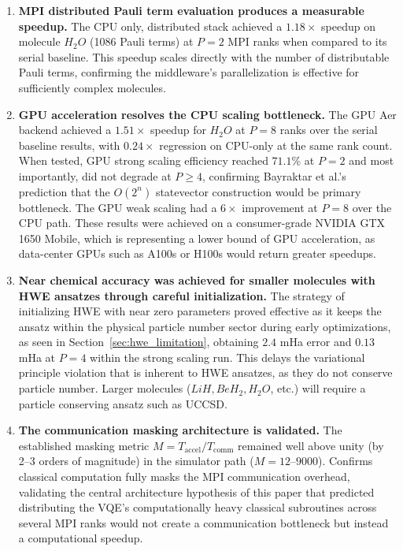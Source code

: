 \begin{enumerate}
    \item \textbf{MPI distributed Pauli term evaluation produces a measurable speedup.} The CPU only, distributed stack achieved a $1.18\times$ speedup on molecule $H_{2}O$ (1086 Pauli terms) at $P=2$ MPI ranks when compared to its serial baseline. This speedup scales directly with the number of distributable Pauli terms, confirming the middleware's parallelization is effective for sufficiently complex molecules.

    \item \textbf{GPU acceleration resolves the CPU scaling bottleneck.} The GPU Aer backend achieved a $1.51\times$ speedup for $H_{2}O$ at $P=8$ ranks over the serial baseline results, with $0.24\times$ regression on CPU-only at the same rank count. When tested, GPU strong scaling efficiency reached $71.1\%$ at $P=2$ and most importantly, did not degrade at $P \geq 4$, confirming Bayraktar et al.'s prediction that the $O(2^n)$ statevector construction would be primary bottleneck. The GPU weak scaling had a $6\times$ improvement at $P=8$ over the CPU path. These results were achieved on a consumer-grade NVIDIA GTX 1650 Mobile, which is representing a lower bound of GPU acceleration, as data-center GPUs such as A100s or H100s would return greater speedups.

    \item \textbf{Near chemical accuracy was achieved for smaller molecules with HWE ansatzes through careful initialization.} The strategy of initializing HWE with near zero parameters proved effective as it keeps the ansatz within the physical particle number sector during early optimizations, as seen in Section~\ref{sec:hwe_limitation}, obtaining $2.4$ mHa error and $0.13$ mHa at $P=4$ within the strong scaling run. This delays the variational principle violation that is inherent to HWE ansatzes, as they do not conserve particle number. Larger molecules ($LiH, BeH_{2}, H_{2}O$, etc.) will require a particle conserving ansatz such as UCCSD. 

    \item \textbf{The communication masking architecture is validated.} The established masking metric $M = T_{\text{accel}} / T_{\text{comm}}$ remained well above unity (by 2--3 orders of magnitude) in the simulator path ($M = 12$--$9000$). Confirms classical computation fully masks the MPI communication overhead, validating the central architecture hypothesis of this paper that predicted distributing the VQE's computationally heavy classical subroutines across several MPI ranks would not create a communication bottleneck but instead a computational speedup.


\end{enumerate}
